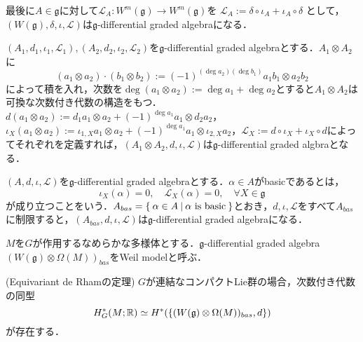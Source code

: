\begin{eg}
最後に$A\in\mathfrak{g}$に対して$\mathcal{L}_A\colon W^m(\mathfrak{g})\rightarrow W^m(\mathfrak{g})$を
$
\mathcal{L}_A:=\delta\circ\iota_A + \iota_A\circ\delta
$
として，$(W(\mathfrak{g}),\delta,\iota,\mathcal{L})$は$\mathfrak{g}$-differential graded algebraになる．
\end{eg}

\begin{eg}\label{tonsor of g-dga}
  $(A_1,d_1,\iota_1,\mathcal{L}_1),(A_2,d_2,\iota_2,\mathcal{L}_2)$を$\mathfrak{g}$-differential graded algebraとする．$A_1\otimes A_2$に
  \[
  (a_1\otimes a_2)\cdot (b_1\otimes b_2):=(-1)^{(\deg a_2)(\deg b_1)}a_1b_1\otimes a_2b_2
  \]
  によって積を入れ，次数を$\deg(a_1\otimes a_2) := \deg a_1 + \deg a_2$とすると$A_1\otimes A_2$は可換な次数付き代数の構造をもつ．
  $d(a_1\otimes a_2) := d_1a_1\otimes a_2 + (-1)^{\deg a_1}a_1\otimes d_2a_2$，$\iota_X(a_1\otimes a_2) := \iota_{1,X}a_1\otimes a_2 + (-1)^{\deg a_1}a_1\otimes\iota_{2,X}a_2$，$\mathcal{L}_X := d\circ \iota_X + \iota_X \circ d$によってそれぞれを定義すれば，$(A_1\otimes A_2,d,\iota,\mathcal{L})$は$\mathfrak{g}$-differential graded algbraとなる．
\end{eg}

\begin{defin}
  $(A,d,\iota,\mathcal{L})$を$\mathfrak{g}$-differential graded algebraとする．$\alpha\in A$がbasicであるとは，
  \[
  \iota_X(\alpha) = 0,\quad\mathcal{L}_X(\alpha) = 0,\quad \forall X\in\mathfrak{g}
  \]
  が成り立つことをいう．$A_{bas}=\left\{\:\alpha\in A\:\middle|\:\alpha\text{ is basic}\:\right\}$とおき，$d,\iota,\mathcal{L}$をすべて$A_{bas}$に制限すると，$(A_{bas},d,\iota,\mathcal{L})$は$\mathfrak{g}$-differential graded algebraになる．
\end{defin}

\begin{defin}
  $M$を$G$が作用するなめらかな多様体とする．$\mathfrak{g}$-differential graded algebra $(W(\mathfrak{g})\otimes\Omega(M))_{bas}$をWeil modelと呼ぶ．
\end{defin}

\begin{theo}(Equivariant de Rhamの定理\cite{tu equivariant})
  $G$が連結なコンパクトLie群の場合，次数付き代数の同型
  \[
  H^*_G(M;\mathbb{R})\simeq H^*(\{(W(\mathfrak{g})\otimes\Omega(M))_{bas},d\})
  \]
  が存在する．
\end{theo}

